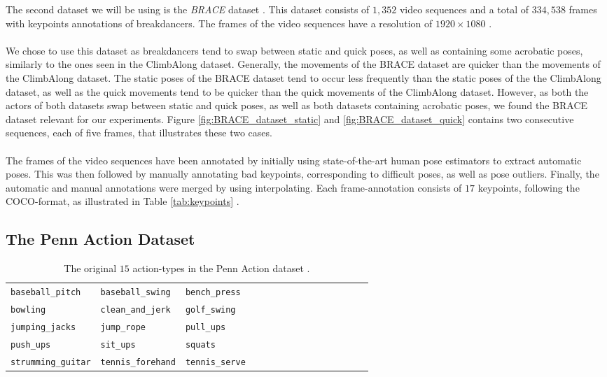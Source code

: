 \documentclass[./main.tex]{subfiles}
\begin{document}
\noindent The second dataset we will be using is the \textit{BRACE} dataset \cite{BRACE}. This dataset consists of $1,352$ video sequences and a total of $334,538$ frames with keypoints annotations of breakdancers. The frames of the video sequences have a resolution of $1920 \times 1080$ \cite{BRACE}.
\\
\\
We chose to use this dataset as breakdancers tend to swap between static and quick poses, as well as containing some acrobatic poses, similarly to the ones seen in the ClimbAlong dataset. Generally, the movements of the BRACE dataset are quicker than the movements of the ClimbAlong dataset. The static poses of the BRACE dataset tend to occur less frequently than the static poses of the the ClimbAlong dataset, as well as the quick movements tend to be quicker than the quick movements of the ClimbAlong dataset. However, as both the actors of both datasets swap between static and quick poses, as well as both datasets containing acrobatic poses, we found the BRACE dataset relevant for our experiments. Figure \ref{fig:BRACE_dataset_static} and \ref{fig:BRACE_dataset_quick} contains two consecutive sequences, each of five frames, that illustrates these two cases.
\\
\\
The frames of the video sequences have been annotated by initially using state-of-the-art human pose estimators to extract automatic poses. This was then followed by manually annotating bad keypoints, corresponding to difficult poses, as well as pose outliers. Finally, the automatic and manual annotations were merged by using interpolating. Each frame-annotation consists of $17$ keypoints, following the COCO-format, as illustrated in Table \ref{tab:keypoints} \cite{BRACE}.

\subsection{The Penn Action Dataset}
\label{sec:PA}
\begin{table}
    \begin{tabular}[htbp]{lllllllllllllll}
        \texttt{baseball\_pitch} & \texttt{baseball\_swing} & \texttt{bench\_press} \\
        \texttt{bowling} & \texttt{clean\_and\_jerk} & \texttt{golf\_swing} \\
        \texttt{jumping\_jacks} & \texttt{jump\_rope} & \texttt{pull\_ups} \\
        \texttt{push\_ups} & \texttt{sit\_ups} & \texttt{squats} \\
        \texttt{strumming\_guitar} & \texttt{tennis\_forehand} & \texttt{tennis\_serve}
    \end{tabular}
    \caption{The original $15$ action-types in the Penn Action dataset \cite{penn_action}.}
    \label{tab:PA_actions}
\end{table}
\end{document}
